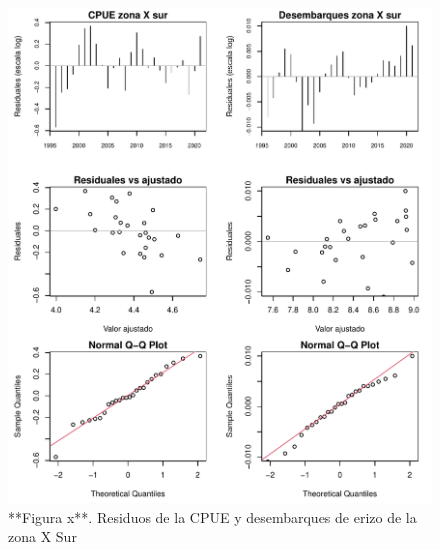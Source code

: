 \documentclass[
]{article}
\begin{document}
\begin{figure}

{\centering \includegraphics{Figuras/Fig_residualesIndicesXS-1} 

}

\caption{**Figura x**. Residuos de la CPUE y desembarques de erizo de la zona X Sur}\label{fig:Fig_residualesIndicesXS}
\end{figure}
\end{document}
